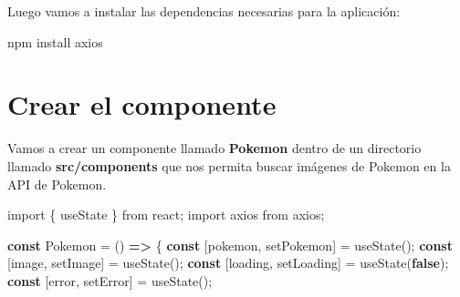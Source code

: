 \documentclass[
  a4paper,
  DIV=11,
  numbers=noendperiod,
  onepage,
  openany]{scrreprt}
\newenvironment{Shaded}{\begin{snugshade}}{\end{snugshade}}
\newcommand{\ExtensionTok}[1]{\textcolor[rgb]{0.00,0.23,0.31}{#1}}
\newcommand{\FunctionTok}[1]{\textcolor[rgb]{0.28,0.35,0.67}{#1}}
\newcommand{\ImportTok}[1]{\textcolor[rgb]{0.00,0.46,0.62}{#1}}
\newcommand{\KeywordTok}[1]{\textcolor[rgb]{0.00,0.23,0.31}{\textbf{#1}}}
\newcommand{\NormalTok}[1]{\textcolor[rgb]{0.00,0.23,0.31}{#1}}
\newcommand{\OperatorTok}[1]{\textcolor[rgb]{0.37,0.37,0.37}{#1}}
\newcommand{\StringTok}[1]{\textcolor[rgb]{0.13,0.47,0.30}{#1}}
\begin{document}
\begin{tcolorbox}
Luego vamos a instalar las dependencias necesarias para la aplicación:

\begin{Shaded}
\begin{Highlighting}[]
\ExtensionTok{npm}\NormalTok{ install axios}
\end{Highlighting}
\end{Shaded}

\section{Crear el componente}\label{crear-el-componente}

Vamos a crear un componente llamado \textbf{Pokemon} dentro de un
directorio llamado \textbf{src/components} que nos permita buscar
imágenes de Pokemon en la API de Pokemon.

\begin{Shaded}
\begin{Highlighting}[]
\ImportTok{import}\NormalTok{ \{ useState \} }\ImportTok{from} \StringTok{\textquotesingle{}react\textquotesingle{}}\OperatorTok{;}
\ImportTok{import}\NormalTok{ axios }\ImportTok{from} \StringTok{\textquotesingle{}axios\textquotesingle{}}\OperatorTok{;}

\KeywordTok{const}\NormalTok{ Pokemon }\OperatorTok{=}\NormalTok{ () }\KeywordTok{=\textgreater{}}\NormalTok{ \{}
  \KeywordTok{const}\NormalTok{ [pokemon}\OperatorTok{,}\NormalTok{ setPokemon] }\OperatorTok{=} \FunctionTok{useState}\NormalTok{(}\StringTok{\textquotesingle{}\textquotesingle{}}\NormalTok{)}\OperatorTok{;}
  \KeywordTok{const}\NormalTok{ [image}\OperatorTok{,}\NormalTok{ setImage] }\OperatorTok{=} \FunctionTok{useState}\NormalTok{(}\StringTok{\textquotesingle{}\textquotesingle{}}\NormalTok{)}\OperatorTok{;}
  \KeywordTok{const}\NormalTok{ [loading}\OperatorTok{,}\NormalTok{ setLoading] }\OperatorTok{=} \FunctionTok{useState}\NormalTok{(}\KeywordTok{false}\NormalTok{)}\OperatorTok{;}
  \KeywordTok{const}\NormalTok{ [error}\OperatorTok{,}\NormalTok{ setError] }\OperatorTok{=} \FunctionTok{useState}\NormalTok{(}\StringTok{\textquotesingle{}\textquotesingle{}}\NormalTok{)}\OperatorTok{;}


\end{Highlighting}
\end{Shaded}
\end{tcolorbox}
\end{document}
